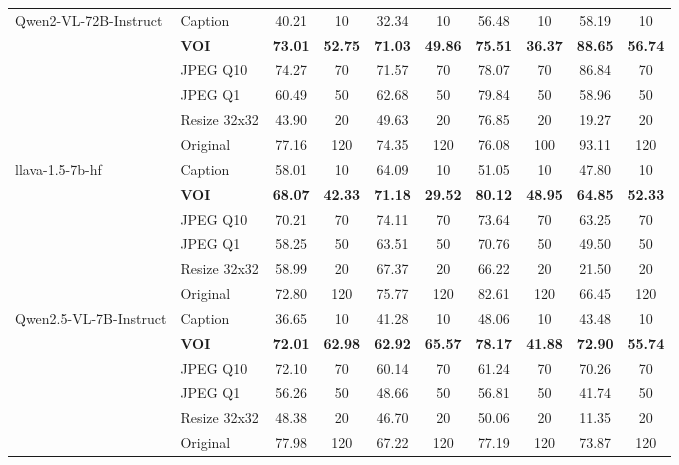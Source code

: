 \begin{table}[p]
{\begin{tabular}{llcccccccc}
\multirow{6}{*}{Qwen2-VL-72B-Instruct}
& Caption & 40.21 & 10 & 32.34 & 10 & 56.48 & 10 & 58.19 & 10 \\
& \textbf{VOI} & \textbf{73.01} & \textbf{52.75} & \textbf{71.03} & \textbf{49.86} & \textbf{75.51} & \textbf{36.37} & \textbf{88.65} & \textbf{56.74} \\
& JPEG Q10 & 74.27 & 70 & 71.57 & 70 & 78.07 & 70 & 86.84 & 70 \\
& JPEG Q1 & 60.49 & 50 & 62.68 & 50 & 79.84 & 50 & 58.96 & 50 \\
& Resize 32x32 & 43.90 & 20 & 49.63 & 20 & 76.85 & 20 & 19.27 & 20 \\
& Original & 77.16 & 120 & 74.35 & 120 & 76.08 & 100 & 93.11 & 120 \\
\midrule

\multirow{6}{*}{llava-1.5-7b-hf}
& Caption & 58.01 & 10 & 64.09 & 10 & 51.05 & 10 & 47.80 & 10 \\
& \textbf{VOI} & \textbf{68.07} & \textbf{42.33} & \textbf{71.18} & \textbf{29.52} & \textbf{80.12} & \textbf{48.95} & \textbf{64.85} & \textbf{52.33} \\
& JPEG Q10 & 70.21 & 70 & 74.11 & 70 & 73.64 & 70 & 63.25 & 70 \\
& JPEG Q1 & 58.25 & 50 & 63.51 & 50 & 70.76 & 50 & 49.50 & 50 \\
& Resize 32x32 & 58.99 & 20 & 67.37 & 20 & 66.22 & 20 & 21.50 & 20 \\
& Original & 72.80 & 120 & 75.77 & 120 & 82.61 & 120 & 66.45 & 120 \\
\midrule

\multirow{6}{*}{Qwen2.5-VL-7B-Instruct}
& Caption & 36.65 & 10 & 41.28 & 10 & 48.06 & 10 & 43.48 & 10 \\
& \textbf{VOI} & \textbf{72.01} & \textbf{62.98} & \textbf{62.92} & \textbf{65.57} & \textbf{78.17} & \textbf{41.88} & \textbf{72.90} & \textbf{55.74} \\
& JPEG Q10 & 72.10 & 70 & 60.14 & 70 & 61.24 & 70 & 70.26 & 70 \\
& JPEG Q1 & 56.26 & 50 & 48.66 & 50 & 56.81 & 50 & 41.74 & 50 \\
& Resize 32x32 & 48.38 & 20 & 46.70 & 20 & 50.06 & 20 & 11.35 & 20 \\
& Original & 77.98 & 120 & 67.22 & 120 & 77.19 & 120 & 73.87 & 120 \\
\midrule


\end{tabular}}
\end{table}
